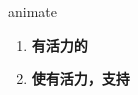 
\begin{frame}
{\huge animate}
\begin{center}
\begin{enumerate}\Large
  \item \textbf{有活力的}
  \item \textbf{使有活力，支持}
\end{enumerate}
\end{center}
\end{frame}
